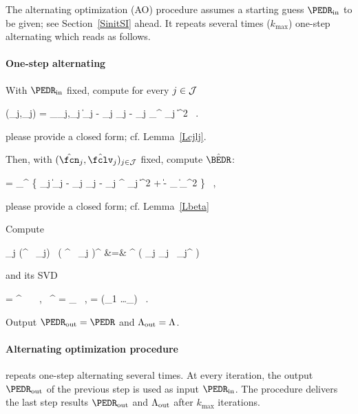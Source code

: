 The alternating optimization (AO) procedure assumes 
a starting guess \( \PEDR_{\init} \) to be given; see Section~\ref{SinitSI} ahead.
It repeats several times (\( k_{\max} \)) one-step alternating which reads as follows.

\paragraph{One-step alternating} 

\begin{mylist}
\item
With \( \PEDR_{\init} \) fixed, compute for every \( j \in \mathcal{J} \)
\begin{EQA}[c]
	(\hat{\fcn}_{j},\hat{\fclv}_{j})
	=
	\arginf_{\fcn_{j},\fclv_{j}} \bigl\| \Imav_{j} - \fcn_{j} \Sv_{j} - \UV_{j} \PEDR_{\init}^{\T} \fclv_{j} \bigr\|^{2}
	\, .
\end{EQA}
{\color{blue} please provide a closed form; cf. Lemma~\ref{Lcjlj}.}

\item 
Then, with \( (\hat{\fcn}_{j},\hat{\fclv}_{j})_{j \in \JJJ} \) fixed, compute \( \hat{\BEDR} \):
\begin{EQA}[c]
	\hat{\BEDR}
	=
	\arginf_{\BEDR \in \R^{\dimm \times \dimd}} 
		\biggl\{ \sum_{j \in \JJJ} \bigl\| \Imav_{j} - \hat{\fcn}_{j} \Sv_{j} - \UV_{j} \BEDR^{\T} \hat{\fclv}_{j} \bigr\|^{2}
	+ \lambda \| \BEDR - \PEDR_{\init} \|_{\Fr}^{2} 
	\biggr\}	
	\, ,
\end{EQA}
{\color{blue} please provide a closed form; cf. Lemma~\ref{Lbeta}}

\item
Compute 
\begin{EQA}[rcl]
	\JEDR
	\eqdef
	\sum_{j \in \JJJ} (\hat{\BEDR}^{\T} \, \hat{\fclv}_{j}) \, \bigl( \hat{\BEDR}^{\T} \, \hat{\fclv}_{j} \bigr)^{\T}
	&=&
	\hat{\BEDR}^{\T} \Bigl( \sum_{j \in \JJJ} \hat{\fclv}_{j} \, \hat{\fclv}_{j}^{\T} \Bigr) \hat{\BEDR}
\end{EQA}
and its SVD
\begin{EQA}[c]
	\JEDR
	=
	\PEDR^{\T} \, \Lambda \, \PEDR
	\, ,
	\qquad
	\PEDR \, \PEDR^{\T}
	= 
	\Id_{\dimm}
	\, ,
	\qquad
	\Lambda = \diag(\lambda_{1} \geq \ldots \geq \lambda_{\dimm})
	\, .
\end{EQA}

\item 
Output \( \PEDR_{\outp} = \PEDR \) and \( \Lambda_{\operatorname{out}} = \Lambda \).
\end{mylist}


\paragraph{Alternating optimization procedure} repeats
one-step alternating several times.
At every iteration, the output \( \PEDR_{\outp} \) of the previous step is used as input \( \PEDR_{\init} \).
The procedure delivers the last step results \( \PEDR_{\outp} \) and \( \Lambda_{\operatorname{out}} \) after \( k_{\max} \) iterations.


